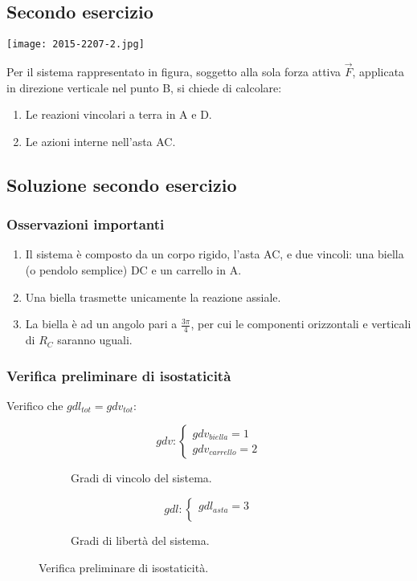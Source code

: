 \documentclass[main.tex]{subfiles}
\begin{document}
\subsection{Secondo esercizio}
\texttt{[image: 2015-2207-2.jpg]}

Per il sistema rappresentato in figura, soggetto alla sola forza attiva $\vec{F}$, applicata in direzione verticale nel punto B, si chiede di calcolare:

\begin{enumerate}
	\item Le reazioni vincolari a terra in A e D.
	\item Le azioni interne nell’asta AC.
\end{enumerate}

\subsection{Soluzione secondo esercizio}

\subsubsection{Osservazioni importanti}

\begin{enumerate}
	\item Il sistema è composto da un corpo rigido, l'asta AC, e due vincoli: una biella (o pendolo semplice) DC e un carrello in A.
	\item Una biella trasmette unicamente la reazione assiale.
	\item La biella è ad un angolo pari a $\frac{3\pi}{4}$, per cui le componenti orizzontali e verticali di $R_C$ saranno uguali.
\end{enumerate}

\subsubsection{Verifica preliminare di isostaticità}
Verifico che $gdl_{tot} = gdv_{tot}$:
\begin{figure}[H]
  \begin{subfigure}[b]{.5\textwidth}
  \centering
  \[
  	gdv: \begin{cases}
		gdv_{biella} = 1\\
		gdv_{carrello} = 2
  	\end{cases}
  \]
  \caption{Gradi di vincolo del sistema.}
  \end{subfigure}
  \hfill
  \begin{subfigure}[b]{.5\textwidth}
  \centering
  \[
  	gdl: \begin{cases}
  		gdl_{asta} = 3\\
  	\end{cases}
  \]
  \caption{Gradi di libertà del sistema.}
  \end{subfigure}
  \caption{Verifica preliminare di isostaticità.}
\end{figure}
\end{document}
